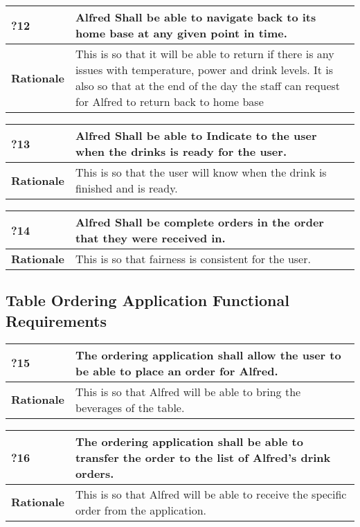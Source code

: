 \documentclass [11pt]{article}
\begin{document}
\begin{longtable}{| p{ } | p{ } | }\hline 
	\rowcolor{tableCell}\textbf{?12} & Alfred Shall be able to navigate back to its home base at any given point in time. \\ \hline
	\textbf{Rationale} &  This is so that it will be able to return if there is any issues with temperature, power and drink levels. It is also so that at the end of the day the staff can request for Alfred to return back to home base\\ \hline 
\end{longtable}

\begin{longtable}{| p{ } | p{ } | }\hline 
	\rowcolor{tableCell}\textbf{?13} & Alfred Shall be able to Indicate to the user when the drinks is ready for the user. \\ \hline
	\textbf{Rationale} &  This is so that the user will know when the drink is finished and is ready.\\ \hline 
\end{longtable}

\begin{longtable}{| p{ } | p{ } | }\hline 
	\rowcolor{tableCell}\textbf{?14} & Alfred Shall be complete orders in the order that they were received in. \\ \hline
	\textbf{Rationale} &  This is so that fairness is consistent for the user.\\ \hline 
\end{longtable}

\subsection{Table Ordering Application Functional Requirements}

\begin{longtable}{| p{ } | p{ } | }\hline 
	\rowcolor{tableCell}\textbf{?15} & The ordering application shall allow the user to be able to place an order for Alfred. \\ \hline
	\textbf{Rationale} &  This is so that Alfred will be able to bring the beverages of the table.\\ \hline 
\end{longtable}


\begin{longtable}{| p{ } | p{ } | }\hline 
	\rowcolor{tableCell}\textbf{?16} & The ordering application shall be able to transfer the order to the list of Alfred's drink orders. \\ \hline
	\textbf{Rationale} &  This is so that Alfred will be able to receive the specific order from the application.\\ \hline 
\end{longtable}
\end{document}
